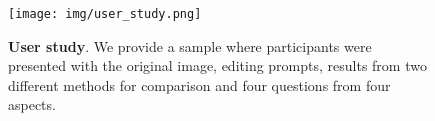 \begin{figure}[t]
    \centering
    \texttt{[image: img/user\_study.png]}
        \caption{\textbf{User study}. We provide a sample where participants were presented with the original image, editing prompts, results from two different methods for comparison and four questions from four aspects.}
    \label{fig:app_user}
    \vspace{-10pt}
\end{figure}

